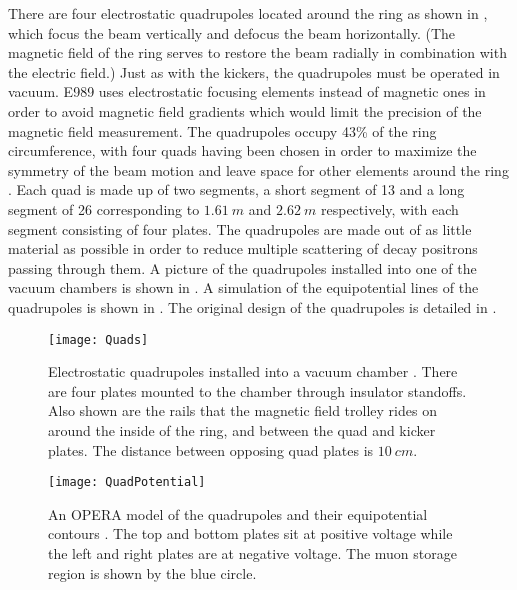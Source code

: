 There are four electrostatic quadrupoles located around the ring as shown in , which focus the beam vertically and defocus the beam horizontally. (The magnetic field of the ring serves to restore the beam radially in combination with the electric field.) Just as with the kickers, the quadrupoles must be operated in vacuum. E989 uses electrostatic focusing elements instead of magnetic ones in order to avoid magnetic field gradients which would limit the precision of the magnetic field measurement. The quadrupoles occupy 43\% of the ring circumference, with four quads having been chosen in order to maximize the symmetry of the beam motion and leave space for other elements around the ring \cite{TDR}. Each quad is made up of two segments, a short segment of 13\textdegree{} and a long segment of 26\textdegree{} corresponding to $\SI{1.61}{m}$ and $\SI{2.62}{m}$ respectively, with each segment consisting of four plates. The quadrupoles are made out of as little material as possible in order to reduce multiple scattering of decay positrons passing through them. A picture of the quadrupoles installed into one of the vacuum chambers is shown in . A simulation of the equipotential lines of the quadrupoles is shown in . The original design of the quadrupoles is detailed in .

\begin{figure}[]
    \centering
    \texttt{[image: Quads]}
    \caption[Electrostatic quadrupoles installed in a vacuum chamber]{Electrostatic quadrupoles installed into a vacuum chamber \cite{QuadsE821}. There are four plates mounted to the chamber through insulator standoffs. Also shown are the rails that the magnetic field trolley rides on around the inside of the ring, and between the quad and kicker plates. The distance between opposing quad plates is $\SI{10}{cm}$.}
    \label{fig:Quads}
\end{figure}

\begin{figure}[]
    \centering
    \texttt{[image: QuadPotential]}
    \caption[Electrostatic quadrupole potentials]{An OPERA model of the quadrupoles and their equipotential contours \cite{TDR}. The top and bottom plates sit at positive voltage while the left and right plates are at negative voltage. The muon storage region is shown by the blue circle.}   
    \label{fig:QuadPotential}
\end{figure}


